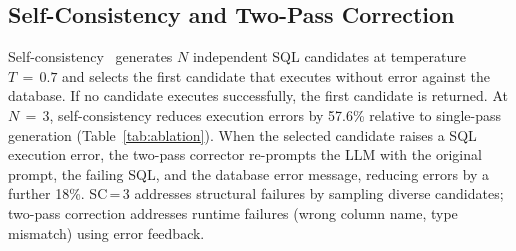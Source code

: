 \subsection{Self-Consistency and Two-Pass Correction}

Self-consistency~\citep{wang2022selfconsistency} generates $N$ independent
SQL candidates at temperature $T\,=\,0.7$ and selects the first candidate
that executes without error against the database.
If no candidate executes successfully, the first candidate is returned.
At $N\,=\,3$, self-consistency reduces execution errors by
57.6\% relative to single-pass generation
(Table~\ref{tab:ablation}).
When the selected candidate raises a SQL execution error, the
two-pass corrector re-prompts the LLM with the original prompt, the
failing SQL, and the database error message, reducing errors by a
further 18\%.
SC\,=\,3 addresses structural failures by sampling diverse candidates;
two-pass correction addresses runtime failures (wrong column name,
type mismatch) using error feedback.
